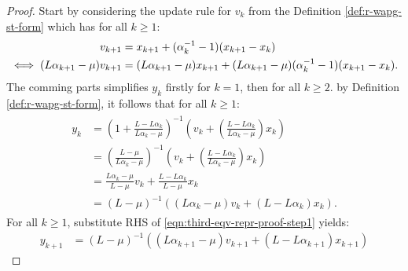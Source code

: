 \documentclass[12pt]{article}
\begin{document}
        \begin{proof}
            Start by considering the update rule for $v_k$ from the Definition \ref{def:r-wapg-st-form} which has for all $k \ge 1$: 
            \begin{align}
                v_{k + 1} &= 
                x_{k + 1} + (\alpha_k^{-1} - 1)(x_{k + 1} - x_k)
                \notag
                \\
                \iff 
                (L \alpha_{k + 1} - \mu)v_{k + 1}  
                &= 
                (L \alpha_{k + 1} - \mu)x_{k + 1} + (L\alpha_{k + 1} - \mu)(\alpha_k^{-1} - 1)(x_{k + 1} - x_k).
                \label{eqn:third-eqv-repr-proof-step1} 
            \end{align}
            The comming parts simplifies $y_k$ firstly for $k = 1$, then for all $k \ge 2$. 
            by Definition \ref{def:r-wapg-st-form}, it follows that for all $k \ge 1$: 
            \begin{align}\label{eqn:third-eqv-repr-proof-step2}
                \begin{split}
                    y_k &= 
                    \left(
                        1 + \frac{L - L\alpha_k}{L\alpha_k - \mu}
                    \right)^{-1}
                    \left(
                        v_k + 
                        \left(\frac{L - L\alpha_k}{L\alpha_k - \mu} \right) x_k
                    \right)
                    \\
                    &= 
                    \left(
                    \frac{L - \mu}{L\alpha_k - \mu} 
                    \right)^{-1}
                    \left(
                        v_k + 
                        \left(\frac{L - L\alpha_k}{L\alpha_k - \mu} \right) x_k
                    \right)
                    \\
                    &= 
                    \frac{L\alpha_k - \mu}{L - \mu} v_k
                    + 
                    \frac{L - L \alpha_k}{L - \mu} x_k
                    \\
                    &= (L - \mu)^{-1}((L \alpha_k - \mu)v_k + (L - L \alpha_k)x_k). 
                \end{split}
            \end{align}
            For all $k\ge 1$, substitute RHS of \eqref{eqn:third-eqv-repr-proof-step1} yields: 
            {\small
            \begin{align*}
                y_{k + 1} &= 
                (L - \mu)^{-1}((L\alpha_{k + 1} - \mu)v_{k + 1} + (L - L \alpha_{k + 1})x_{k + 1})

\end{align*}}
\end{proof}
\end{document}
